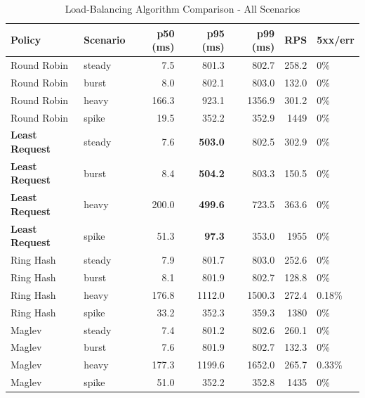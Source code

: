 \documentclass[conference]{IEEEtran}
\begin{document}
\begin{table}[t]
  \centering
  \caption{Load-Balancing Algorithm Comparison  -  All Scenarios}
  \label{tab:results}
  \begin{tabular}{llrrrrl}
    \toprule
    Policy                 & Scenario & p50 (ms) & p95 (ms)       & p99 (ms) & RPS   & 5xx/err \\
    \midrule
    Round Robin            & steady   & 7.5      & 801.3          & 802.7    & 258.2 & 0\%     \\
    Round Robin            & burst    & 8.0      & 802.1          & 803.0    & 132.0 & 0\%     \\
    Round Robin            & heavy    & 166.3    & 923.1          & 1356.9   & 301.2 & 0\%     \\
    Round Robin            & spike    & 19.5     & 352.2          & 352.9    & 1449  & 0\%     \\
    \midrule
    \textbf{Least Request} & steady   & 7.6      & \textbf{503.0} & 802.5    & 302.9 & 0\%     \\
    \textbf{Least Request} & burst    & 8.4      & \textbf{504.2} & 803.3    & 150.5 & 0\%     \\
    \textbf{Least Request} & heavy    & 200.0    & \textbf{499.6} & 723.5    & 363.6 & 0\%     \\
    \textbf{Least Request} & spike    & 51.3     & \textbf{97.3}  & 353.0    & 1955  & 0\%     \\
    \midrule
    Ring Hash              & steady   & 7.9      & 801.7          & 803.0    & 252.6 & 0\%     \\
    Ring Hash              & burst    & 8.1      & 801.9          & 802.7    & 128.8 & 0\%     \\
    Ring Hash              & heavy    & 176.8    & 1112.0         & 1500.3   & 272.4 & 0.18\%  \\
    Ring Hash              & spike    & 33.2     & 352.3          & 359.3    & 1380  & 0\%     \\
    \midrule
    Maglev                 & steady   & 7.4      & 801.2          & 802.6    & 260.1 & 0\%     \\
    Maglev                 & burst    & 7.6      & 801.9          & 802.7    & 132.3 & 0\%     \\
    Maglev                 & heavy    & 177.3    & 1199.6         & 1652.0   & 265.7 & 0.33\%  \\
    Maglev                 & spike    & 51.0     & 352.2          & 352.8    & 1435  & 0\%     \\
    \bottomrule
  \end{tabular}
\end{table}
\end{document}
